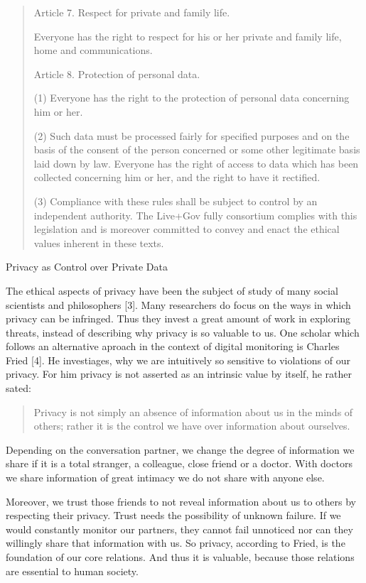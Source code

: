\documentclass[external]{20120615_deliverable_template_ukob}
\theoremstyle{definition}
\begin{document}
\begin{quote}
Article 7. Respect for private and family life.

Everyone has the right to respect for his or her private and family
life, home and communications.

Article 8. Protection of personal data.

(1) Everyone has the right to the protection of personal data
concerning him or her.

(2) Such data must be processed fairly for specified purposes and on
the basis of the consent of the person concerned or some other
legitimate basis laid down by law.  Everyone has the right of access
to data which has been collected concerning him or her, and the right
to have it rectified.

(3) Compliance with these rules shall be subject to control by an
independent authority.  The Live+Gov fully consortium complies with
this legislation and is moreover committed to convey and enact the
ethical values inherent in these texts.
\end{quote}

Privacy as Control over Private Data

The ethical aspects of privacy have been the subject of study of many
social scientists and philosophers [3]. Many researchers do focus on
the ways in which privacy can be infringed. Thus they invest a great
amount of work in exploring threats, instead of describing why privacy
is so valuable to us. One scholar which follows an alternative aproach
in the context of digital monitoring is Charles Fried [4]. He
investiages, why we are intuitively so sensitive to violations of our
privacy. For him privacy is not asserted as an intrinsic value by
itself, he rather sated:

\begin{quote}
Privacy is not simply an absence of information about us in the minds of others;
rather it is the control we have over information about ourselves.
\end{quote}

Depending on the conversation partner, we change the degree of
information we share if it is a total stranger, a colleague, close
friend or a doctor. With doctors we share information of great
intimacy we do not share with anyone else.

Moreover, we trust those friends to not reveal information about us to
others by respecting their privacy. Trust needs the possibility of
unknown failure. If we would constantly monitor our partners, they
cannot fail unnoticed nor can they willingly share that information
with us.  So privacy, according to Fried, is the foundation of our
core relations. And thus it is valuable, because those relations are
essential to human society.
\end{document}
